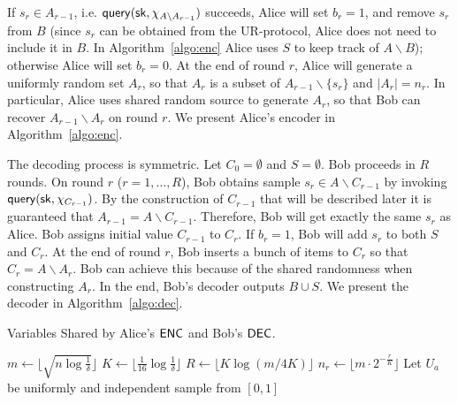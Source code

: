 If $s_r\in A_{r-1}$, i.e. $\mathsf{query}(\mathsf{sk}, \chi_{A\backslash A_{r-1}})$ succeeds, Alice will set $b_r=1$, and remove $s_r$ from $B$ (since $s_r$ can be obtained from the UR-protocol, Alice does not need to include it in $B$. In Algorithm~\ref{algo:enc} Alice uses $S$ to keep track of $A\backslash B$); otherwise Alice will set $b_r=0$.
At the end of round $r$, Alice will generate a uniformly random set $A_r$, so that $A_r$ is a subset of $A_{r-1}\backslash \{s_r\}$ and $|A_r|=n_r$. 
In particular, Alice uses shared random source to generate $A_r$, so that Bob can recover $A_{r-1}\backslash A_r$ on round $r$. 
We present Alice's encoder in Algorithm~\ref{algo:enc}.

The decoding process is symmetric. Let $C_0=\emptyset$ and $S=\emptyset$. Bob proceeds in $R$ rounds. 
On round $r$ ($r=1,\ldots,R$), Bob obtains sample $s_r\in A\backslash C_{r-1}$ by invoking $\mathsf{query}(\mathsf{sk}, \chi_{C_{r-1}})$. 
By the construction of $C_{r-1}$ that will be described later it is guaranteed that $A_{r-1}=A\backslash C_{r-1}$. 
Therefore, Bob will get exactly the same $s_r$ as Alice. 
Bob assigns initial value $C_{r-1}$ to $C_r$.
If $b_r=1$, Bob will add $s_r$ to both $S$ and $C_r$.
At the end of round $r$, Bob inserts a bunch of items to $C_r$ so that $C_r=A\backslash A_r$. Bob can achieve this because of the shared randomness when constructing $A_r$.
In the end, Bob's decoder outputs $B\cup S$.
We present the decoder in Algorithm~\ref{algo:dec}.

\begin{algorithm}[H] 
  \caption{Variables Shared by Alice's $\textsf{ENC}$ and Bob's $\textsf{DEC}$.} \label{algo:para}
  \begin{algorithmic}[1] 
    \State $m\leftarrow \lfloor \sqrt{n \log\frac{1}{\delta}} \rfloor$ 
    \State $K\leftarrow \lfloor \frac{1}{16}\log \frac{1}{\delta} \rfloor$
    \State $R\leftarrow \lfloor K\log(m/4K) \rfloor$
      \State $n_r\leftarrow \lfloor m \cdot 2^{-\frac{r}{K}} \rfloor$ 
    \EndFor
      \State Let $U_a$ be uniformly and independent sample from $[0,1]$ 
    \EndFor
  \end{algorithmic}
\end{algorithm}

